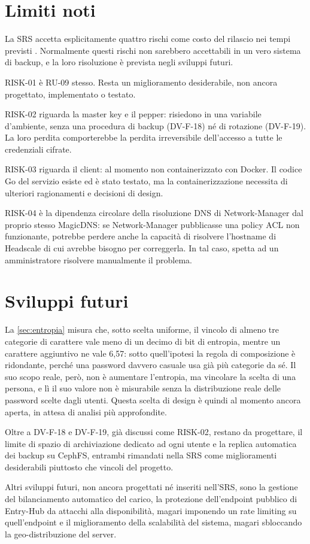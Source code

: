\section{Limiti noti}

La SRS accetta esplicitamente quattro rischi come costo del rilascio nei tempi previsti \cite{ramusb-srs}. 
Normalmente questi rischi non sarebbero accettabili in un vero sistema di backup, e la loro risoluzione è 
prevista negli sviluppi futuri. 

RISK-01 è RU-09 stesso. Resta un miglioramento desiderabile, non ancora progettato, implementato o testato.

RISK-02 riguarda la master key e il pepper: risiedono in una variabile d'ambiente, senza una procedura di backup
(DV-F-18) né di rotazione (DV-F-19). La loro perdita
comporterebbe la perdita irreversibile dell'accesso a tutte le credenziali cifrate.

RISK-03 riguarda il client: al momento non containerizzato con Docker. Il codice Go del servizio esiste ed è 
stato testato, ma la containerizzazione necessita di ulteriori ragionamenti e decisioni di design.

RISK-04 è la dipendenza circolare della risoluzione DNS di Network-Manager dal proprio stesso MagicDNS: se
Network-Manager pubblicasse una policy ACL non funzionante, potrebbe perdere anche la capacità di
risolvere l'hostname di Headscale di cui avrebbe bisogno per correggerla. In tal caso, spetta ad un 
amministratore risolvere manualmente il problema.

\section{Sviluppi futuri}

La \autoref{sec:entropia} misura che, sotto scelta uniforme, il vincolo di almeno tre categorie di
carattere vale meno di un decimo di bit di entropia, mentre un carattere aggiuntivo ne vale 6,57: sotto
quell'ipotesi la regola di composizione è ridondante, perché una password davvero casuale
usa già più categorie da sé. Il suo scopo reale, però, non è aumentare l'entropia, ma vincolare la scelta
di una persona, e lì il suo valore non è misurabile senza la distribuzione reale delle password scelte 
dagli utenti. 
Questa scelta di design è quindi al momento ancora aperta, in attesa di analisi più approfondite.

Oltre a DV-F-18 e DV-F-19, già discussi come RISK-02, restano da progettare, il limite
di spazio di archiviazione dedicato ad ogni utente e la replica automatica dei backup su CephFS, entrambi 
rimandati nella SRS come miglioramenti desiderabili piuttosto che vincoli del progetto.

Altri sviluppi futuri, non ancora progettati né inseriti nell'SRS, sono la gestione del bilanciamento 
automatico del carico, la protezione dell'endpoint pubblico di Entry-Hub da attacchi alla disponibilità, 
magari imponendo un rate limiting su quell'endpoint e il miglioramento della scalabilità del sistema, magari 
sbloccando la geo-distribuzione del server.